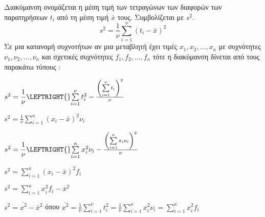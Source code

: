 Διακύμανση ονομάζεται η μέση τιμή των τετραγώνων των διαφορών των παρατηρήσεων $ t_i $ από τη μέση τιμή $ \bar{x} $ τους. Συμβολίζεται με $ s^2 $.
\[ s^2=\frac{1}{\nu}\sum_{i=1}^{\nu}{(t_i-\bar{x})^2} \]
Σε μια κατανομή συχνοτήτων αν μια μεταβλητή έχει τιμές $ x_1,x_2,\ldots,x_\kappa $ με συχνότητες $ \nu_1,\nu_2,\ldots,\nu_\kappa $ και σχετικές συχνότητες $ f_1,f_2,\ldots,f_\kappa $ τότε η διακύμανση δίνεται από τους παρακάτω τύπους :
\begin{multicols}{2}
\begin{rlist}
\item $ s^2=\dfrac{1}{\nu}\LEFTRIGHT\{\}{\sum\limits_{i=1}^{\nu}{t_i^2}-\frac{\left( \sum\limits_{i=1}^{\nu}{t_i}\right)^2 }{\nu}} $
\item $ s^2=\frac{1}{\nu}\sum\limits_{i=1}^{\kappa}{(x_i-\bar{x})^2\nu_i} $
\item $ s^2=\dfrac{1}{\nu}\LEFTRIGHT\{\}{\sum\limits_{i=1}^{\kappa}{x_i^2\nu_i}-\frac{\left( \sum\limits_{i=1}^{\kappa}{x_i\nu_i}\right)^2 }{\nu}} $
\item $ s^2=\sum\limits_{i=1}^{\kappa}{(x_i-\bar{x})^2 f_i} $
\end{rlist}
\end{multicols}
\begin{rlist}[start=5]
\item $ s^2=\sum\limits_{i=1}^{\kappa}{x_i^2f_i}-\bar{x}^2 $
\item $ s^2=\overline{x^2}-\bar{x}^2 $ όπου $ \overline{x^2}=\frac{1}{\nu}\sum\limits_{i=1}^{\nu}{t_i^2}=\frac{1}{\nu}\sum\limits_{i=1}^{\kappa}{x_i^2\nu_i}=\sum\limits_{i=1}^{\kappa}{x_i^2f_i} $
\end{rlist}

